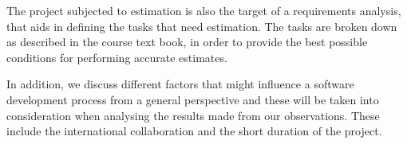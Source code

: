 The project subjected to estimation is also the target of a requirements analysis, that aids in defining the tasks that need estimation. The tasks are broken down as described in the course text book, in order to provide the best possible conditions for performing accurate estimates.

In addition, we discuss different factors that might influence a software development process from a general perspective and these will be taken into consideration when analysing the results made from our observations. These include the international collaboration and the short duration of the project. \\


 



